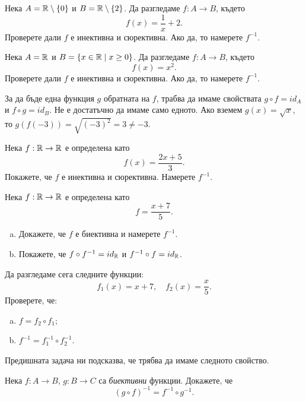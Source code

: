 \begin{problem}
  Нека $A = \mathbb{R} \setminus \{0\}$ и $B = \mathbb{R} \setminus \{2\}$.
  Да разгледаме $f:A \to B$, където
  \[f(x) = \frac{1}{x} + 2.\]
  Проверете дали $f$ е инективна и сюрективна.
  Ако да, то намерете $f^{-1}$.
\end{problem}

\begin{problem}
  Нека $A = \mathbb{R}$ и $B = \{x \in \mathbb{R} \mid x \geq 0\}$.
  Да разгледаме $f:A \to B$, където
  \[f(x) = x^2.\]
  Проверете дали $f$ е инективна и сюрективна.
  Ако да, то намерете $f^{-1}$.
\end{problem}
\begin{hint}
  За да бъде една функция $g$ обратната на $f$,
  трабва да имаме свойствата $g\circ f = id_A$ и $f \circ g = id_B$.
  Не е достатъчно да имаме само едното.
  Ако вземем $g(x) = \sqrt{x}$,  то 
  $g(f(-3)) = \sqrt{(-3)^2} = 3 \neq -3$.
\end{hint}

\begin{problem}
  Нека $f:\mathbb{R} \to \mathbb{R}$ е определена като
  \[f(x) = \frac{2x+5}{3}.\]
  Покажете, че $f$ е инективна и сюрективна.
  Намерете $f^{-1}$.
\end{problem}

\begin{problem}
  Нека $f:\mathbb{R} \to \mathbb{R}$ е определена като 
  \[f = \frac{x+7}{5}.\]
  \begin{enumerate}[a)]
  \item 
    Докажете, че $f$ е биективна и намерете $f^{-1}$.
  \item
    Покажете, че $f\circ f^{-1} = id_{\mathbb{R}}$ и $f^{-1}\circ f = id_{\mathbb{R}}$.
  \end{enumerate}
  Да разгледаме сега следните функции:
  \[f_1(x) = x+7, \quad f_2(x) = \frac{x}{5}.\]
  Проверете, че:
  \begin{enumerate}[a)]
  \item 
    $f = f_2 \circ f_1$;
  \item
    $f^{-1} = f^{-1}_1 \circ f^{-1}_2$.
  \end{enumerate}
\end{problem}

Предишната задача ни подсказва, че трябва да имаме следното свойство.
\begin{problem}
  Нека $f: A\to B$, $g: B\to C$ са {\em биективни} функции.
  Докажете, че
  \[(g\circ f)^{-1} = f^{-1}\circ g^{-1}.\]
\end{problem}

